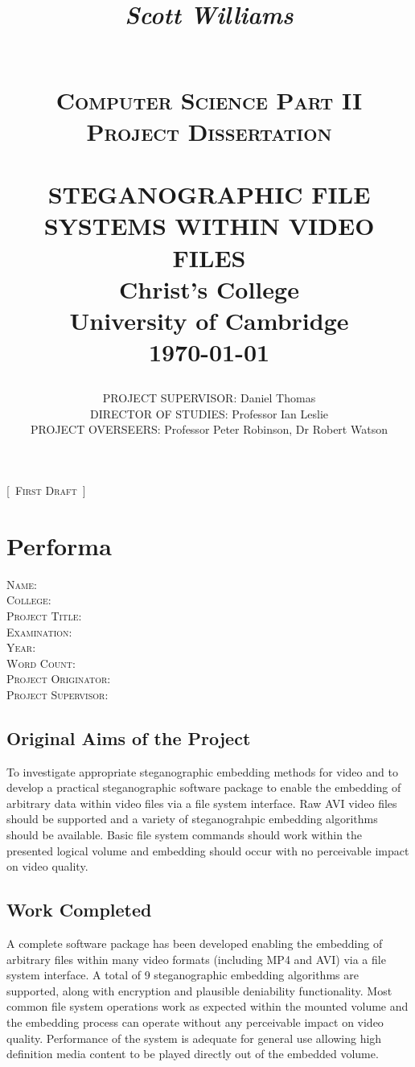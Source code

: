 \documentclass[paper=a4, fontsize=11pt,twoside]{scrartcl}
\title{
	\begin{flushright}
		\LARGE{\textit{Scott Williams}}
	\end{flushright}
	~\\[2.0cm]			
	\normalsize \textsc{Computer Science Part II Project Dissertation}\\[2.0cm]     
    \HRule{0.5pt} \\                        
    \LARGE \textbf{\uppercase{Steganographic file systems within video files}}    
    \HRule{2pt} \\[30pt]        
    \normalsize Christ's College\\[5pt]University of Cambridge\\[25pt]           
    \normalsize \today            
}
\author{
    \begin{spacing}{1.5}
        \noindent
        \uppercase{Project Supervisor}: Daniel Thomas\\    
        \uppercase{Director of Studies}: Professor Ian Leslie\\    
        \uppercase{Project Overseers}: Professor Peter Robinson, Dr Robert Watson\\
    \end{spacing}
}
\makeatletter
\numberwithin{table}{section}
\numberwithin{figure}{section}
\numberwithin{algorithm}{section}
\def\printtitle{%
    {\centering \@title\par}}
\newcommand\blankpage{%
    \null
    \thispagestyle{empty}%
    \addtocounter{page}{-1}%
    \newpage}
\makeatother
\begin{document}
\renewcommand{\thelstlisting}{\thesection.\arabic{lstlisting}}
\thispagestyle{empty}        

\printtitle                    
\vfill
\begin{center}
\huge{[~}\normalsize \textsc{First Draft}\huge{~]}
\end{center}
\afterpage{\blankpage}
\newpage
\setcounter{page}{1}        
\section*{Performa}
\textsc{Name}: \\
\textsc{College}: \\
\textsc{Project Title}: \\
\textsc{Examination}: \\
\textsc{Year}: \\
\textsc{Word Count}: \\
\textsc{Project Originator}: \\
\textsc{Project Supervisor}: \\

\subsection*{Original Aims of the Project}
To investigate appropriate steganographic embedding methods for video and to develop a practical steganographic software package to enable the embedding of arbitrary data within video files via a file system interface. Raw AVI video files should be supported and a variety of steganograhpic embedding algorithms should be available. Basic file system commands should work within the presented logical volume and embedding should occur with no perceivable impact on video quality.

\subsection*{Work Completed}
A complete software package has been developed enabling the embedding of arbitrary files within many video formats (including MP4 and AVI) via a file system interface. A total of 9 steganographic embedding algorithms are supported, along with encryption and plausible deniability functionality. Most common file system operations work as expected within the mounted volume and the embedding process can operate without any perceivable impact on video quality. Performance of the system is adequate for general use allowing high definition media content to be played directly out of the embedded volume.
\end{document}
